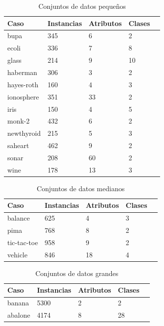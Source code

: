 \documentclass[11pt]{article}
\begin{document}
\begin{table}[h]
\begin{tabular}{ |l|l|l|l|l| }
    \hline
    Caso    & Instancias & Atributos & Clases \\ \hline
    bupa & 345  & 6 &  2 \\ \hline
    ecoli & 336 & 7 & 8 \\ \hline
    glass & 214 & 9 & 10 \\ \hline
    haberman & 306 & 3 & 2 \\ \hline
    hayes-roth & 160 & 4 & 3 \\ \hline
    ionosphere & 351 & 33 & 2 \\ \hline
    iris & 150 & 4 & 5 \\ \hline
    monk-2 & 432 & 6 & 2 \\ \hline
    newthyroid & 215  & 5 & 3 \\ \hline
    saheart & 462 & 9 & 2 \\ \hline
    sonar & 208 & 60 & 2 \\ \hline
    wine & 178 & 13 & 3 \\ \hline
\end{tabular}
\caption{Conjuntos de datos pequeños}
\label{tabla:1}
\end{table}

\begin{table}[h]
\begin{tabular}{ |l|l|l|l|l| }
    \hline
    Caso    & Instancias & Atributos & Clases \\ \hline
    balance & 625  & 4 &  3 \\ \hline
    pima & 768  & 8 &  2 \\ \hline
    tic-tac-toe & 958  & 9 &  2 \\ \hline
    vehicle & 846  & 18 &  4 \\ \hline
\end{tabular}
\caption{Conjuntos de datos medianos}
\label{tabla:1}
\end{table}

\begin{table}[h]
\begin{tabular}{ |l|l|l|l|l| }
    \hline
    Caso    & Instancias & Atributos & Clases \\ \hline
    banana & 5300  & 2 &  2 \\ \hline
    abalone & 4174  & 8 &  28 \\ \hline
\end{tabular}
\caption{Conjuntos de datos grandes}
\label{tabla:1}
\end{table}
\end{document}
